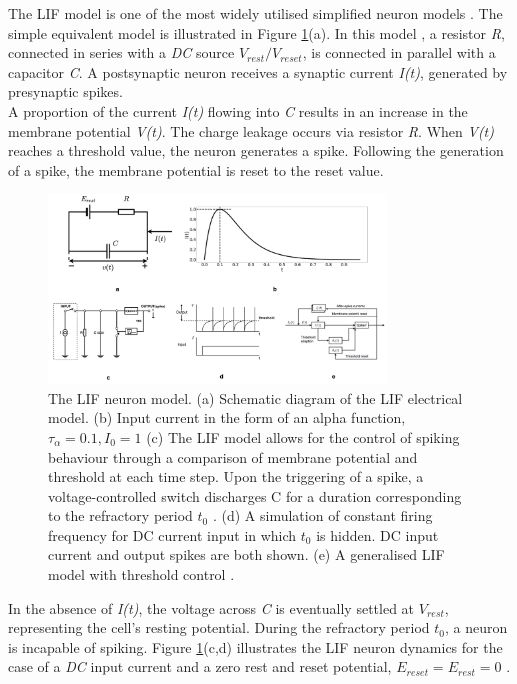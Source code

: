 \noindent The LIF model is one of the most widely utilised simplified neuron models \cite{lapique1907researches}. The simple equivalent model is illustrated in Figure \ref{fig:2d}(a). In this model \cite{stein1967frequency}, a resistor \textit{R}, connected in series with a \textit{DC} source $V_{rest}/V_{reset}$, is connected in parallel with a capacitor \textit{C}. A postsynaptic neuron receives a synaptic current \textit{I(t)}, generated by presynaptic spikes. \\

\noindent A proportion of the current \textit{I(t)} flowing into \textit{C} results in an increase in the membrane potential \textit{V(t)}. The charge leakage occurs via resistor \textit{R}. When \textit{V(t)} reaches a threshold value, the neuron generates a spike. Following the generation of a spike, the membrane potential is reset to the reset value. \\

\begin{figure}[htbp!] 
    \centering    
    \includegraphics[width=0.8\textwidth]{Chapter2/Figs/d.png}
    \caption[The Leaky Integrate-and-Fire neuron model.]{The LIF neuron model. (a) Schematic diagram of the LIF electrical model. (b) Input current in the form of an alpha function, $\tau_{\alpha} = 0.1, I_0 = 1$ (c) The LIF model allows for the control of spiking behaviour through a comparison of membrane potential and threshold at each time step. Upon the triggering of a spike, a voltage-controlled switch discharges C for a duration corresponding to the refractory period $t_0$ \cite{tal1997computing}. (d) A simulation of constant firing frequency for DC current input in which $t_0$ is hidden. DC input current and output spikes are both shown. (e) A generalised LIF model with threshold control \cite{teeter2018generalized}. }
    \label{fig:2d}
\end{figure}

\noindent In the absence of \textit{I(t)}, the voltage across \textit{C} is eventually settled at $V_{rest}$, representing the cell's resting potential. During the refractory period $t_0$, a neuron is incapable of spiking. Figure \ref{fig:2d}(c,d) illustrates the LIF neuron dynamics for the case of a \textit{DC} input current and a zero rest and reset potential, $E_{reset} = E_{rest} = 0$ \cite{tal1997computing}. \\

